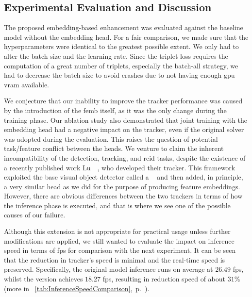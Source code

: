 \subsection{Experimental Evaluation and Discussion}

The proposed embedding-based enhancement was evaluated against the baseline model without the embedding head. For a fair comparison, we made sure that the hyperparameters were identical to the greatest possible extent. We only had to alter the batch size and the learning rate. Since the triplet loss requires the computation of a great number of triplets, especially the batch-all strategy, we had to decrease the batch size to avoid crashes due to not having enough \gls{gpu} \gls{vram} available.


We conjecture that our inability to improve the tracker performance was caused by the introduction of the \gls{femb} itself, as it was the only change during the training phase. Our ablation study also demonstrated that joint training with the embedding head had a negative impact on the tracker, even if the original solver was adopted during the evaluation. This raises the question of potential task/feature conflict between the heads. We venture to claim the inherent incompatibility of the detection, tracking, and \gls{reid} tasks, despite the existence of a recently published work Lu~\etal{}~\cite{lu2020retinatrack}, who developed their \retinatrack{} tracker. This framework exploited the base visual object detector called a \retinanet{}~\cite{lin2018focal} and then added, in principle, a very similar head as we did for the purpose of producing feature embeddings. However, there are obvious differences between the two trackers in terms of how the inference phase is executed, and that is where we see one of the possible causes of our failure.

Although this extension is not appropriate for practical usage unless further modifications are applied, we still wanted to evaluate the impact on inference speed in terms of \gls{fps} for comparison with the next experiment. It can be seen that the reduction in tracker's speed is minimal and the real-time speed is preserved. Specifically, the original model inference runs on average at $26.49$ \gls{fps}, whilst the \fembmodel{} version achieves $18.27$ \gls{fps}, resulting in reduction speed of about $31$\% (more in \tabletext{}~\ref{tab:InferenceSpeedComparison},~p.~\pageref{tab:InferenceSpeedComparison}).

